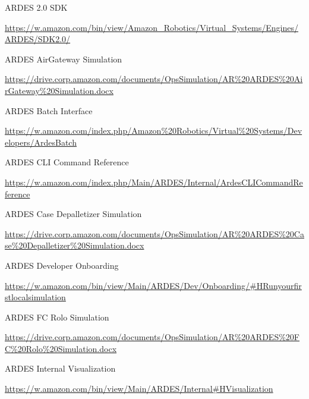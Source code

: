 \documentclass[10pt,oneside,x11names]{article}
\begin{document}
\begin{description}
\item[{ARDES 2.0 SDK}] \mbox{}
\end{description}
\url{https://w.amazon.com/bin/view/Amazon\_Robotics/Virtual\_Systems/Engines/ARDES/SDK2.0/}

\begin{description}
\item[{ARDES AirGateway Simulation}] \mbox{}
\end{description}
\url{https://drive.corp.amazon.com/documents/OpsSimulation/AR\%20ARDES\%20AirGateway\%20Simulation.docx}

\begin{description}
\item[{ARDES Batch Interface}] \mbox{}
\end{description}
\url{https://w.amazon.com/index.php/Amazon\%20Robotics/Virtual\%20Systems/Developers/ArdesBatch}

\begin{description}
\item[{ARDES CLI Command Reference}] \mbox{}
\end{description}
\url{https://w.amazon.com/index.php/Main/ARDES/Internal/ArdesCLICommandReference}

\begin{description}
\item[{ARDES Case Depalletizer Simulation}] \mbox{}
\end{description}
\url{https://drive.corp.amazon.com/documents/OpsSimulation/AR\%20ARDES\%20Case\%20Depalletizer\%20Simulation.docx}

\begin{description}
\item[{ARDES Developer Onboarding}] \mbox{}
\end{description}
\url{https://w.amazon.com/bin/view/Main/ARDES/Dev/Onboarding/\#HRunyourfirstlocalsimulation}

\begin{description}
\item[{ARDES FC Rolo Simulation}] \mbox{}
\end{description}
\url{https://drive.corp.amazon.com/documents/OpsSimulation/AR\%20ARDES\%20FC\%20Rolo\%20Simulation.docx}

\begin{description}
\item[{ARDES Internal Visualization}] \mbox{}
\end{description}
\url{https://w.amazon.com/bin/view/Main/ARDES/Internal\#HVisualization}
\end{document}
